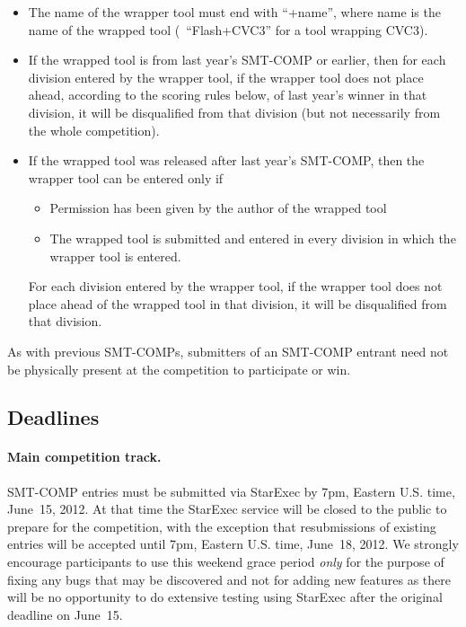 \documentclass[12pt]{article}
\begin{document}
\begin{itemize}
\item The name of the wrapper tool must end with ``+name'', where name
is the name of the wrapped tool (\eg\ ``Flash+CVC3'' for a tool
wrapping CVC3).

\item If the wrapped tool is from last year's SMT-COMP or earlier, then for
each division entered by the wrapper tool, if the wrapper tool does not place ahead, according to the scoring
rules below, of last year's winner in that division, it will be disqualified
from that division (but not necessarily from the whole competition).

\item If the wrapped tool was released after last year's SMT-COMP,
then the wrapper tool can be entered only if

\begin{itemize}
\item Permission has been given by the author of the wrapped tool

\item The wrapped tool is submitted and entered in every division
      in which the wrapper tool is entered.
\end{itemize}

For each division entered by the wrapper tool, if the wrapper tool
does not place ahead of the wrapped tool in that division, it will be
disqualified from that division.
\end{itemize}

As with previous SMT-COMPs, submitters of an SMT-COMP entrant need not 
be physically present at the competition to
participate or win.

\subsection*{Deadlines} %

\paragraph{Main competition track.} %
SMT-COMP entries must be submitted via StarExec by 7pm, Eastern U.S.
time, June~15, 2012.  At that time the StarExec service will be
closed to the public to prepare for the competition, with the
exception that resubmissions of existing entries will be accepted
until 7pm, Eastern U.S. time, June~18, 2012.  We strongly encourage
participants to use this weekend grace period \emph{only} for the
purpose of fixing any bugs that may be discovered and not for adding
new features as there will be no opportunity to do extensive testing
using StarExec after the original deadline on June~15.
\end{document}
